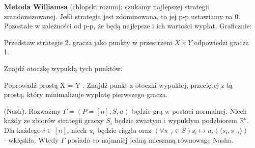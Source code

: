 \begin{definicja}
    \textbf{Metoda Williamsa} (chłopski rozum): szukamy najlepszej strategii zrandomizowanej. Jeśli strategia jest zdominowana, to jej p-p ustawiamy na 0. Pozostałe w zależności od p-p, że będą najlepsze i ich wartości wypłat. Graficznie: 
    \begin{enumerate*}[label=\roman*)] 
        \item  Przedstaw strategie 2. gracza jako punkty w przestrzeni $X \times Y$ odpowiedzi gracza 1. 
        \item Znajdź otoczkę wypukłą tych punktów. 
        \item Poprowadź prostą X = Y . Znajdź punkt z otoczki wypukłej, przeciętej z tą prostą, który minimalizuje wypłatę pierwszego gracza.
    \end{enumerate*}
\end{definicja}

\begin{twierdzenie}
    (Nash). Rozważmy $\Gamma = (P = [n],S,u)$ będzie grą w postaci normalnej. Niech każdy ze zbiorów strategii graczy $S_i$ będzie zwartym i wypukłym podzbiorem $\mathbb{R}^k$. Dla każdego $i \in [n]$, niech $u_i$ będzie ciągła oraz $(\forall s_{-i} \in S) s_i \mapsto u_i(\langle s_i, s_{-i} \rangle)$ - wklęskła. Wtedy $\Gamma$ posiada co najmniej jedną mieszaną równowagę Nasha.
\end{twierdzenie}